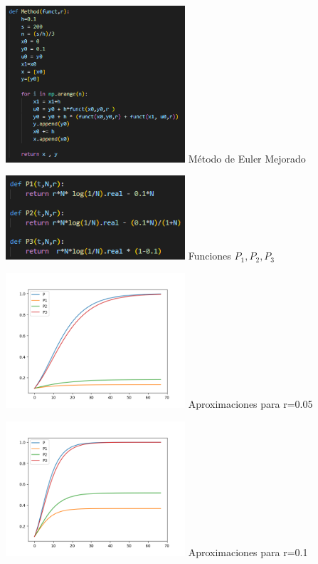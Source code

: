 \documentclass[a4 paper, 12pt]{article}
\begin{document}
\begin{center}

\includegraphics[width=0.5\textwidth]{EulerMej}
 {M\'etodo de Euler Mejorado} \label{MetodoEuler}

\includegraphics[width=0.5\textwidth]{func}
 {Funciones $P_1 , P_2, P_3$} \label{Funciones $P_1 , P_2, P_3$}

\includegraphics[width=0.5\textwidth]{r=0.05}
 {Aproximaciones para r=0.05} \label{aprox}

\includegraphics[width=0.5\textwidth]{r=0.1}
 {Aproximaciones para r=0.1} \label{aprox1}


\end{center}
\end{document}
